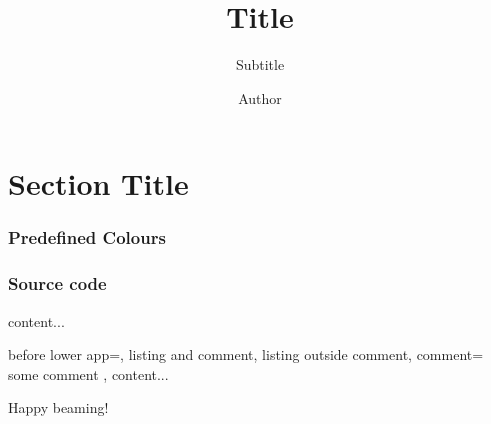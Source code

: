 \documentclass{ltx-talk}
\title{Title}
\author{Author}
\institute{Institute}
\subtitle{Subtitle}
\begin{document}
\maketitle

\section{Section Title}

\begin{frame}
  \frametitle{Predefined Colours}
  \samcolours
\end{frame}

\begin{frame*}
\frametitle{Source code}
\begin{tcblisting}{}
      content...
\end{tcblisting}

\begin{tcblisting}{
  before lower app=\setlength{\parskip}{\bigskipamount},
  listing and comment,
  listing outside comment,
  comment={%
    some comment
  },
}
content...
\end{tcblisting}
\end{frame*}

\begin{frame}
  Happy beaming!
\end{frame}
\end{document}
